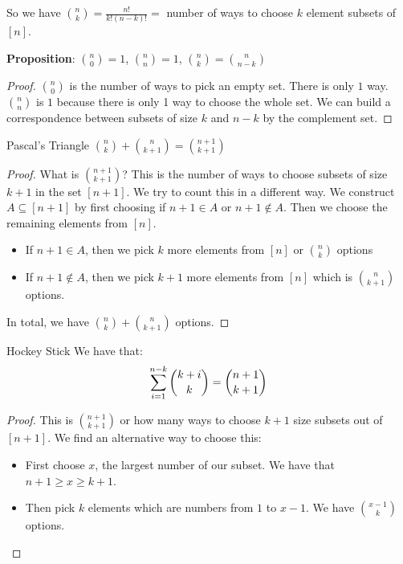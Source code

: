 \documentclass{report}
\begin{document}
So we have $\binom{n}{k} = \frac{n!}{k!(n - k)!} =$ number of ways to choose $k$ element subsets of $[n]$.

\textbf{Proposition}: $\binom{n}{0} = 1$, $\binom{n}{n} = 1$, $\binom{n}{k} = \binom{n}{n - k}$
    \begin{proof}
        $\binom{n}{0}$ is the number of ways to pick an empty set. There is only $1$ way. $\binom{n}{n}$ is $1$ because there is only 1 way to choose the whole set. We can build a correspondence between subsets of size $k$ and $n - k$ by the complement set.
    \end{proof}

\begin{theorem}{Pascal's Triangle}
    $\binom{n}{k} + \binom{n}{k+ 1} = \binom{n + 1}{k + 1}$
\end{theorem}
    \begin{proof}
        What is $\binom{n + 1}{k + 1}$? This is the number of ways to choose subsets of size $k + 1$ in the set $[n + 1]$. We try to count this in a different way. We construct $A \subseteq [n + 1]$ by first choosing if $n + 1 \in A$ or $n + 1 \notin A$. Then we choose the remaining elements from $[n]$.
            \begin{itemize}
                \item If $n + 1 \in A$, then we pick $k$ more elements from $[n]$ or $\binom{n}{k} $ options

                \item If $n + 1 \notin A$, then we pick $k + 1$ more elements from $[n]$ which is $\binom{n}{k + 1}$ options. 
            \end{itemize}
        In total, we have $\binom{n}{k} + \binom{n}{k + 1} $ options.
    \end{proof}

\begin{theorem}{Hockey Stick}
    We have that:
        \begin{equation*}
            \sum_{i = 1}^{n - k} \dbinom{k + i}{k} = \dbinom{n + 1}{k + 1}
        \end{equation*}
\end{theorem}
    \begin{proof}
        This is $\binom{n + 1}{k + 1}$ or how many ways to choose $k + 1$ size subsets out of $[n + 1]$. We find an alternative way to choose this:
            \begin{itemize}
                \item First choose $x$, the largest number of our subset. We have that $n + 1 \geq x \geq k + 1$.

                \item Then pick $k$ elements which are numbers from $1$ to $x - 1$. We have $\binom{x - 1}{k}$ options.
            \end{itemize}
    \end{proof}
\end{document}
